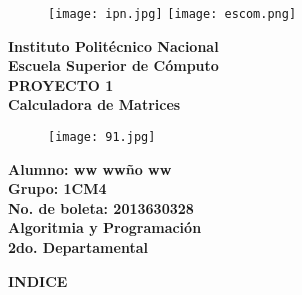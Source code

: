 \documentclass[letterpaper]{article}
\begin{document}
\pagestyle{empty}

\begin{figure}
	\texttt{[image: ipn.jpg]}
	\hspace{12.5cm}
	\texttt{[image: escom.png]}
\end{figure}

\begin{center}
\textbf{\LARGE Instituto Polit\'ecnico Nacional\\} %
\textbf{\Large Escuela Superior de C\'omputo\\}
\vspace{0.9cm}
\textbf{\LARGE PROYECTO 1\\}
\textbf{\Large Calculadora de Matrices\\}
\vspace{0.5cm}
\end{center}

\begin{center}
\begin{figure}[H] %
	\hspace{3cm}\texttt{[image: 91.jpg]}
\end{figure}
\end{center}

\begin{center}
\textbf{\Large Alumno: ww ww\~no ww\\} %
\textbf{\Large Grupo: 1CM4\\}
\textbf{\Large No. de boleta: 2013630328\\}
\vspace{0.9cm}
\textbf{\LARGE Algoritmia y Programaci\'on\\}
\textbf{\Large 2do. Departamental\\}
\end{center}

\clearpage

\begin{center}
\textbf{\LARGE INDICE\\}
\vspace{1.0cm}
\end{center}
\end{document}
